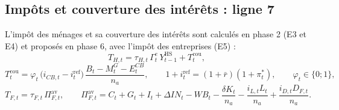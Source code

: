 \documentclass[11pt,a4paper]{article}
\begin{document}
\subsection{Impôts et couverture des intérêts : ligne 7}
\label{sec:finances_publiques-impots}
\begin{proposee}
L'impôt des ménages et sa couverture des intérêts sont calculés en phase 2 (E3 et E4) et proposés en phase 6, avec l'impôt des entreprises (E5) :
\begin{equation*}
T_{H,t} = \tau_{H,t}\,\Gamma^e_t\,Y^{\mathrm{HS}}_{t-1} + T^{\mathrm{cou}}_t , \tag{E3}
\end{equation*}
\begin{equation*}
T^{\mathrm{cou}}_t = \varphi_t\,\bigl(i_{\mathit{CB},t} - i^{\mathrm{ref}}_t\bigr)\,\frac{B_t - M^G_t - E^{\mathit{CB}}_t}{n_a}, \qquad 1 + i^{\mathrm{ref}}_t = (1 + \bar r)(1 + \pi^\ast_t), \qquad \varphi_t \in \{0 ; 1\} , \tag{E4}
\end{equation*}
\begin{equation*}
T_{F,t} = \tau_{F,t}\,\Pi^{\mathrm{av}}_{F,t}, \qquad \Pi^{\mathrm{av}}_{F,t} = C_t + G_t + I_t + \Delta\mathit{IN}_t - \mathit{WB}_t - \frac{\delta K_t}{n_a} - \frac{i_{L,t} L_t}{n_a} + \frac{i_{D,t} D_{F,t}}{n_a} . \tag{E5}
\end{equation*}


\end{proposee}
\end{document}
